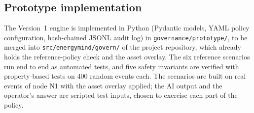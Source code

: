 \documentclass[11pt,a4paper]{article}
\renewcommand{\_}{\textunderscore\allowbreak}
\begin{document}
\subsection{Prototype implementation}
The Version~1 engine is implemented in Python (Pydantic models, YAML policy configuration, hash-chained JSONL
audit log) in \texttt{governance/prototype/}, to be merged into \texttt{src/energymind/govern/} of the project
repository, which already holds the reference-policy check and the asset overlay. The six reference scenarios
run end to end as automated tests, and five safety invariants are verified with property-based tests on 400
random events each. The scenarios are built on real events of node N1 with the asset overlay applied; the AI
output and the operator's answer are scripted test inputs, chosen to exercise each part of the policy.
\end{document}
